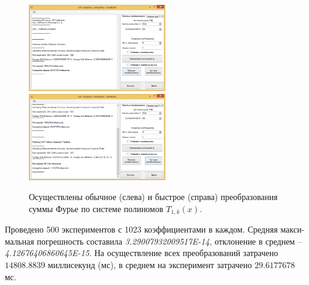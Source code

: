 \begin{figure}[H]
	\begin{center}
		\includegraphics[width=170pt]{pictures/sms-stn-1(4)}
		\quad
		\includegraphics[width=170pt]{pictures/sms-stn-1(5)}
		\caption{
			Осуществлены обычное (слева) и быстрое (справа) преобразования суммы Фурье по системе полиномов $T_{1,k}(x)$.
		}\label{sms-stn-1-img3}
	\end{center}
\end{figure}

Проведено 500 экспериментов с 1023 коэффициентами в каждом.
Средняя макси-\linebreak мальная погрешность составила \textit{3.29007932009517E-14}, отклонение в среднем -- \linebreak \textit{4.12676406860645E-15}.
На осуществление всех преобразований затрачено $14808.8839$ миллисекунд (мс), в среднем на эксперимент затрачено $29.6177678$ мс.


